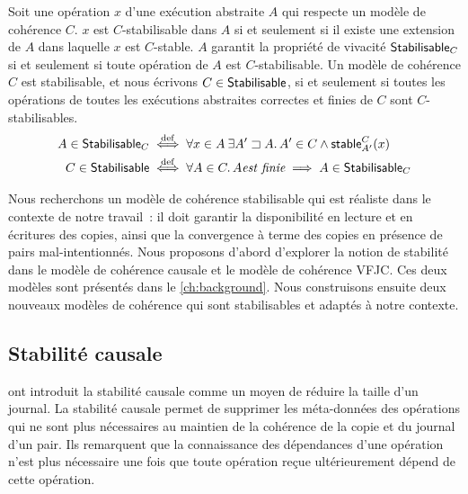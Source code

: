 \begin{definition}\label{def:stabilisable}
Soit une opération $x$ d'une exécution abstraite $A$ qui respecte un modèle de cohérence $C$.
$x$ est $C$-stabilisable dans $A$ si et seulement si il existe une extension de $A$ dans laquelle $x$ est $C$-stable.
$A$ garantit la propriété de vivacité $\operatorname{\mathsf{Stabilisable}}_C$ si et seulement si toute opération de $A$ est $C$-stabilisable.
Un modèle de cohérence $C$ est stabilisable, et nous écrivons $C \in \operatorname{\mathsf{Stabilisable}}$, si et seulement si toutes les opérations de toutes les exécutions abstraites correctes et finies de $C$ sont $C$-stabilisables.
\begin{align*}
    A \in \operatorname{\mathsf{Stabilisable}}_C &\overset{\mathrm{def}}{\iff} \forall x \in A \:\exists A' \sqsupset A \ldotp A' \in C \land \operatorname{\mathsf{stable}}_{A'}^C(x)\\
    C \in \operatorname{\mathsf{Stabilisable}} &\overset{\mathrm{def}}{\iff} \forall A \in C \ldotp A \textit{est finie} \implies A \in \operatorname{\mathsf{Stabilisable}}_C
\end{align*}
\end{definition}

Nous recherchons un modèle de cohérence stabilisable qui est réaliste dans le contexte de notre travail~: il doit garantir la disponibilité en lecture et en écritures des copies, ainsi que la convergence à terme des copies en présence de pairs mal-intentionnés.
Nous proposons d'abord d'explorer la notion de stabilité dans le modèle de cohérence causale et le modèle de cohérence \acl{VFJC}.
Ces deux modèles sont présentés dans le \autoref{ch:background}.
Nous construisons ensuite deux nouveaux modèles de cohérence qui sont stabilisables et adaptés à notre contexte.


\clearpage %

\subsection{Stabilité causale}\label{subsec:cs}

\textcite{baquero_2018_pure-op-crdt} ont introduit la stabilité causale comme un moyen de réduire la taille d'un journal.
La stabilité causale permet de supprimer les méta-données des opérations qui ne sont plus nécessaires au maintien de la cohérence de la copie et du journal d'un pair.
Ils remarquent que la connaissance des dépendances d'une opération n'est plus nécessaire une fois que toute opération reçue ultérieurement dépend de cette opération.


